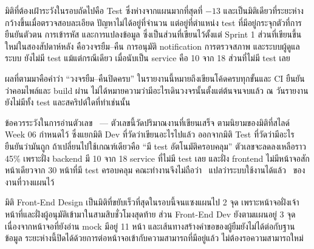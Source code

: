 มิติที่ต้องเฝ้าระวังในรอบถัดไปคือ Test ซึ่งห่างจากแผนมากที่สุดที่ $-13$ และเป็นมิติเดียวที่ระยะห่างกว้างขึ้นเมื่อตรวจสอบละเอียด ปัญหาไม่ได้อยู่ที่จำนวน แต่อยู่ที่ตำแหน่ง test ที่มีอยู่กระจุกตัวที่การยืนยันตัวตน การเข้ารหัส และการแปลงข้อมูล ซึ่งเป็นส่วนที่เขียนไว้ตั้งแต่ Sprint 1 ส่วนที่เขียนขึ้นใหม่ในสองสัปดาห์หลัง คือวงจรยืม–คืน การอนุมัติ notification การตรวจสภาพ และระบบผู้ดูแลระบบ ยังไม่มี test แม้แต่กรณีเดียว เมื่อนับเป็น service คือ 10 จาก 18 ส่วนที่ไม่มี test เลย

ผลที่ตามมาคือคำว่า ``วงจรยืม–คืนปิดครบ'' ในรายงานนี้หมายถึงเขียนโค้ดครบทุกขั้นและ CI ยืนยันว่าคอมไพล์และ build ผ่าน ไม่ได้หมายความว่ามีอะไรเดินวงจรนั้นตั้งแต่ต้นจนจบแล้ว ณ วันรายงานยังไม่มีทั้ง test และสคริปต์ใดที่ทำเช่นนั้น

ข้อควรระวังในการอ่านตัวเลข \actualpct\ — ตัวเลขนี้วัดปริมาณงานที่เขียนเสร็จ ตามนิยามของมิติที่สไลด์ Week 06 กำหนดไว้ ซึ่งแยกมิติ Dev ที่วัดว่าเขียนอะไรไปแล้ว ออกจากมิติ Test ที่วัดว่ามีอะไรยืนยันว่ามันถูก ถ้าเปลี่ยนไปใช้เกณฑ์เดียวคือ ``มี test อัตโนมัติครอบคลุม'' ตัวเลขจะลดลงเหลือราว 45\% เพราะฝั่ง backend มี 10 จาก 18 service ที่ไม่มี test เลย และฝั่ง frontend ไม่มีหน้าจอสักหน้าเดียวจาก 30 หน้าที่มี test ครอบคลุม คณะทำงานจึงไม่ถือว่า \actualpct\ แปลว่าระบบใช้งานได้แล้ว \actualpct\ ของงานที่วางแผนไว้

มิติ Front-End Design เป็นมิติที่ขยับเร็วที่สุดในรอบนี้จนแซงแผนไป 2 จุด เพราะหน้าจอฝั่งเจ้าหน้าที่และฝั่งผู้อนุมัติเข้ามาในสามสิบชั่วโมงสุดท้าย ส่วน Front-End Dev ยังตามแผนอยู่ 3 จุด เนื่องจากหน้าจอที่ยังอ่าน mock มีอยู่ 11 หน้า และเส้นทางสร้างคำขอของผู้ยืมยังไม่ได้ต่อกับฐานข้อมูล ระยะห่างนี้ปิดได้ด้วยการต่อหน้าจอเข้ากับความสามารถที่มีอยู่แล้ว ไม่ต้องรอความสามารถใหม่


